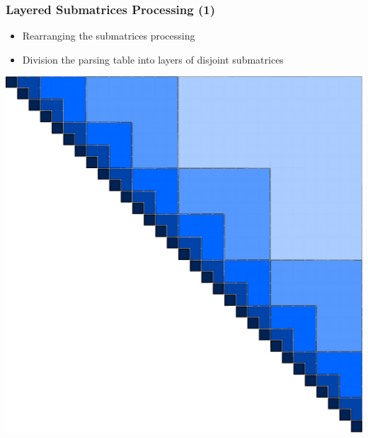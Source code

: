 \documentclass[xcolor=table]{beamer}
\begin{document}
\begin{frame}[fragile] \frametitle{Layered Submatrices Processing (1)}

    \vspace{55pt}
    \begin{itemize}
    \item Rearranging the submatrices processing
    \item Division the parsing table into \linebreak layers of disjoint submatrices
    \end{itemize}
        
    \vspace{-130pt}\hspace{165pt}\includegraphics[width = 0.5\linewidth]{pic/layers.pdf}

    
\end{frame}
\end{document}
